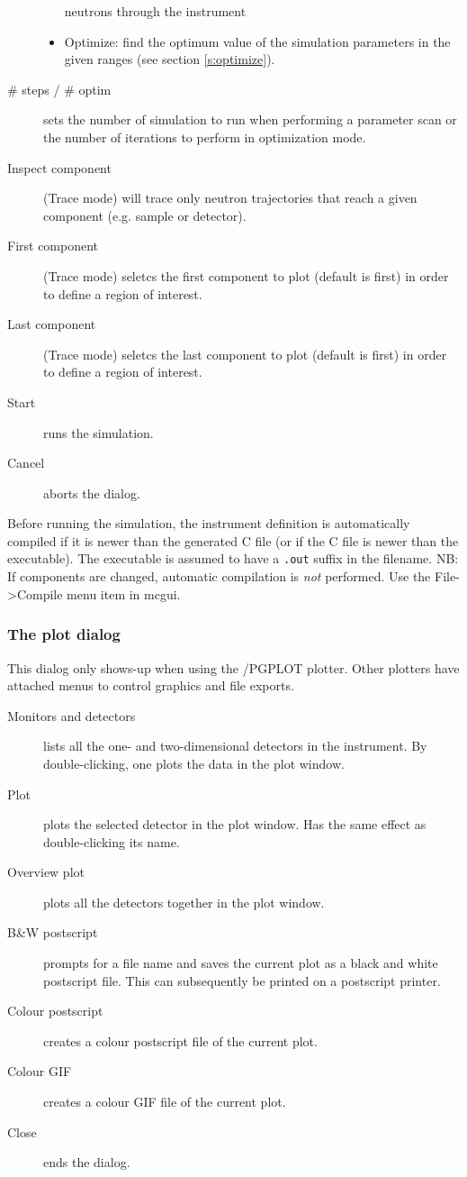 \begin{description}
\begin{itemize}
    neutrons through the instrument
  \item Optimize: find the optimum value of the simulation parameters
    in the given ranges (see section \ref{s:optimize}).
\end{itemize}
\item[\# steps / \# optim] sets the number of simulation to run when
  performing a parameter scan or the number of iterations to
  perform in optimization mode.
\item[Inspect component] (Trace mode) will trace only neutron trajectories that reach a given component (e.g. sample or detector).
\item[First component] (Trace mode) seletcs the first component to plot (default is first) in order to define a region of interest.
\item[Last component] (Trace mode) seletcs the last component to plot (default is first) in order to define a region of interest.
\item[Start] runs the simulation.
\item[Cancel] aborts the dialog.
\end{description}

Before running the simulation, the instrument definition is
automatically compiled if it is newer than the generated C file (or if the C file
is newer than the executable). The executable is
assumed to have a \verb+.out+ suffix in the filename. NB: If
components are changed, automatic compilation is \emph{not}
performed. Use the File->Compile menu item in mcgui.


\subsubsection{The plot dialog} 
This dialog only shows-up when using the \MCS/PGPLOT plotter. Other plotters have attached menus to control graphics and file exports.
\begin{description}
\item[Monitors and detectors] lists all the one- and
  two-dimensional detectors in the instrument. By double-clicking, one plots
  the data in the plot window.
\item[Plot] plots the selected detector in the plot window. Has the
  same effect as double-clicking its name.
\item[Overview plot] plots all the detectors together in the plot
  window.
\item[B\&W postscript] prompts for a file name and saves the
  current plot as a black and white postscript file. This can
  subsequently be printed on a postscript printer.
\item[Colour postscript] creates a colour postscript file of the
  current plot.
\item[Colour GIF] creates a colour GIF file of the
  current plot.
\item[Close] ends the dialog.
\end{description}


